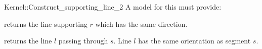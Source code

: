 \begin{ccRefFunctionObjectConcept}{Kernel::Construct_supporting_line_2}
A model for this must provide:


       {returns the line supporting $r$ which has the same direction.}

       {returns the line $l$ passing through $s$. Line $l$  has the
        same orientation as segment $s$.}

\ccIsModel{}

\end{ccRefFunctionObjectConcept}
